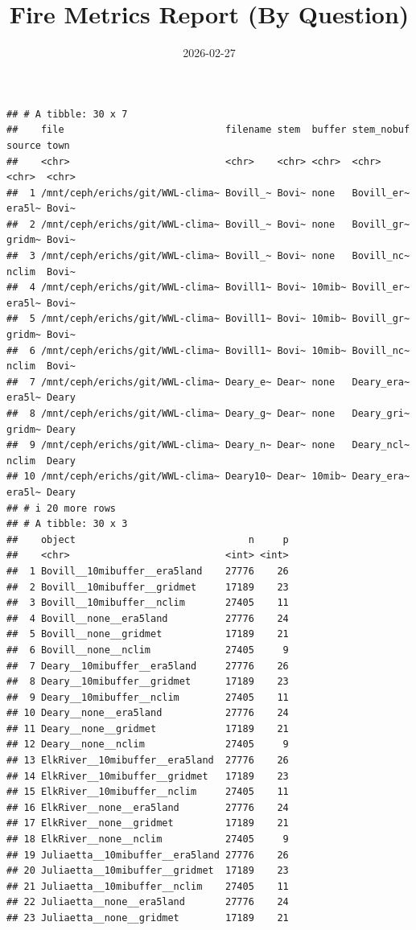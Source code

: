 \documentclass[
]{article}
\title{Fire Metrics Report (By Question)}
\author{}
\date{\vspace{-2.5em}2026-02-27}
\begin{document}
\maketitle

{
\setcounter{tocdepth}{2}
\tableofcontents
}
\begin{verbatim}
## # A tibble: 30 x 7
##    file                            filename stem  buffer stem_nobuf source town 
##    <chr>                           <chr>    <chr> <chr>  <chr>      <chr>  <chr>
##  1 /mnt/ceph/erichs/git/WWL-clima~ Bovill_~ Bovi~ none   Bovill_er~ era5l~ Bovi~
##  2 /mnt/ceph/erichs/git/WWL-clima~ Bovill_~ Bovi~ none   Bovill_gr~ gridm~ Bovi~
##  3 /mnt/ceph/erichs/git/WWL-clima~ Bovill_~ Bovi~ none   Bovill_nc~ nclim  Bovi~
##  4 /mnt/ceph/erichs/git/WWL-clima~ Bovill1~ Bovi~ 10mib~ Bovill_er~ era5l~ Bovi~
##  5 /mnt/ceph/erichs/git/WWL-clima~ Bovill1~ Bovi~ 10mib~ Bovill_gr~ gridm~ Bovi~
##  6 /mnt/ceph/erichs/git/WWL-clima~ Bovill1~ Bovi~ 10mib~ Bovill_nc~ nclim  Bovi~
##  7 /mnt/ceph/erichs/git/WWL-clima~ Deary_e~ Dear~ none   Deary_era~ era5l~ Deary
##  8 /mnt/ceph/erichs/git/WWL-clima~ Deary_g~ Dear~ none   Deary_gri~ gridm~ Deary
##  9 /mnt/ceph/erichs/git/WWL-clima~ Deary_n~ Dear~ none   Deary_ncl~ nclim  Deary
## 10 /mnt/ceph/erichs/git/WWL-clima~ Deary10~ Dear~ 10mib~ Deary_era~ era5l~ Deary
## # i 20 more rows
## # A tibble: 30 x 3
##    object                              n     p
##    <chr>                           <int> <int>
##  1 Bovill__10mibuffer__era5land    27776    26
##  2 Bovill__10mibuffer__gridmet     17189    23
##  3 Bovill__10mibuffer__nclim       27405    11
##  4 Bovill__none__era5land          27776    24
##  5 Bovill__none__gridmet           17189    21
##  6 Bovill__none__nclim             27405     9
##  7 Deary__10mibuffer__era5land     27776    26
##  8 Deary__10mibuffer__gridmet      17189    23
##  9 Deary__10mibuffer__nclim        27405    11
## 10 Deary__none__era5land           27776    24
## 11 Deary__none__gridmet            17189    21
## 12 Deary__none__nclim              27405     9
## 13 ElkRiver__10mibuffer__era5land  27776    26
## 14 ElkRiver__10mibuffer__gridmet   17189    23
## 15 ElkRiver__10mibuffer__nclim     27405    11
## 16 ElkRiver__none__era5land        27776    24
## 17 ElkRiver__none__gridmet         17189    21
## 18 ElkRiver__none__nclim           27405     9
## 19 Juliaetta__10mibuffer__era5land 27776    26
## 20 Juliaetta__10mibuffer__gridmet  17189    23
## 21 Juliaetta__10mibuffer__nclim    27405    11
## 22 Juliaetta__none__era5land       27776    24
## 23 Juliaetta__none__gridmet        17189    21

\end{verbatim}
\end{document}
